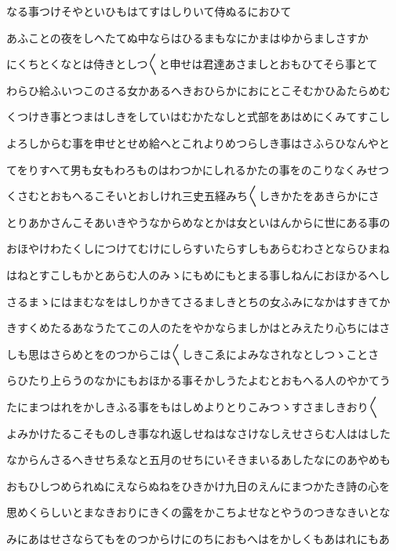 \documentclass[a4paper,11pt,landscape]{ltjtarticle}
\begin{document}
\par\medskip
なる事つけそやといひもはてすはしりいて侍ぬるにおひて
\par\medskip
あふことの夜をしへたてぬ中ならはひるまもなにかまはゆからましさすか
\par\medskip
にくちとくなとは侍きとしつ〱と申せは君達あさましとおもひてそら事とて
\par\medskip
わらひ給ふいつこのさる女かあるへきおひらかにおにとこそむかひゐたらめむ
\par\medskip
くつけき事とつまはしきをしていはむかたなしと式部をあはめにくみてすこし
\par\medskip
よろしからむ事を申せとせめ給へとこれよりめつらしき事はさふらひなんやと
\par\medskip
てをりすへて男も女もわろものはわつかにしれるかたの事をのこりなくみせつ
\par\medskip
くさむとおもへるこそいとおしけれ三史五経みち〱しきかたをあきらかにさ
\par\medskip
とりあかさんこそあいきやうなからめなとかは女といはんからに世にある事の
\par\medskip
おほやけわたくしにつけてむけにしらすいたらすしもあらむわさとならひまね
\par\medskip
はねとすこしもかとあらむ人のみゝにもめにもとまる事しねんにおほかるへし
\par\medskip
さるまゝにはまむなをはしりかきてさるましきとちの女ふみになかはすきてか
\par\medskip
きすくめたるあなうたてこの人のたをやかならましかはとみえたり心ちにはさ
\par\medskip
しも思はさらめとをのつからこは〱しきこゑによみなされなとしつゝことさ
\par\medskip
らひたり上らうのなかにもおほかる事そかしうたよむとおもへる人のやかてう
\par\medskip
たにまつはれをかしきふる事をもはしめよりとりこみつゝすさましきおり〱
\par\medskip
よみかけたるこそものしき事なれ返しせねはなさけなしえせさらむ人ははした
\par\medskip
なからんさるへきせちゑなと五月のせちにいそきまいるあしたなにのあやめも
\par\medskip
おもひしつめられぬにえならぬねをひきかけ九日のえんにまつかたき詩の心を
\par\medskip
思めくらしいとまなきおりにきくの露をかこちよせなとやうのつきなきいとな
\par\medskip
みにあはせさならてもをのつからけにのちにおもへはをかしくもあはれにもあ
\par\medskip
\end{document}
